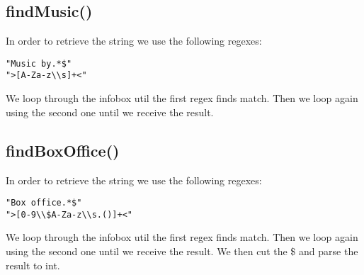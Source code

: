 \documentclass[a4paper,12pt]{article}
\begin{document}
\subsection{findMusic()}
In order to retrieve the string we use the following regexes:
\begin{lstlisting}
"Music by.*$"
">[A-Za-z\\s]+<"
\end{lstlisting}
We loop through the infobox util the first regex finds match. Then we loop again using the second one until we receive the result.

\subsection{findBoxOffice()}
In order to retrieve the string we use the following regexes:
\begin{lstlisting}
"Box office.*$"
">[0-9\\$A-Za-z\\s.()]+<"
\end{lstlisting}
We loop through the infobox util the first regex finds match. Then we loop again using the second one until we receive the result. We then cut the \$ and parse the result to int.
\end{document}

